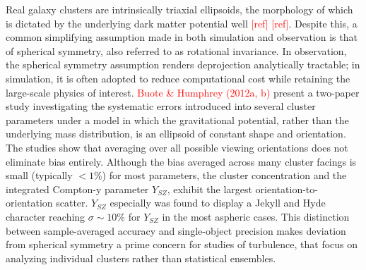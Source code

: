 Real galaxy clusters are intrinsically triaxial ellipsoids, the morphology of which is dictated by the underlying dark matter potential well \textcolor{red}{[ref]} \textcolor{red}{[ref]}. Despite this, a common simplifying assumption made in both simulation and observation is that of spherical symmetry, also referred to as rotational invariance. In observation, the spherical symmetry assumption renders deprojection analytically tractable; in simulation, it is often adopted to reduce computational cost while retaining the large-scale physics of interest. \textcolor{red}{Buote \& Humphrey (2012a, b)} present a two-paper study investigating the systematic errors introduced into several cluster parameters under a model in which the gravitational potential, rather than the underlying mass distribution, is an ellipsoid of constant shape and orientation.
\pbreak
The studies show that averaging over all possible viewing orientations does not eliminate bias entirely. Although the bias averaged across many cluster facings is small (typically $<1 \%$) for most parameters, the cluster concentration and the integrated Compton-y parameter $Y_{SZ}$, exhibit the largest orientation-to-orientation scatter. $Y_{SZ}$ especially was found to display a Jekyll and Hyde character reaching $\sigma \sim 10 \%$ for $Y_{SZ}$ in the most aspheric cases. This distinction between sample-averaged accuracy and single-object precision makes deviation from spherical symmetry a prime concern for studies of turbulence, that focus on analyzing individual clusters rather than statistical ensembles.
